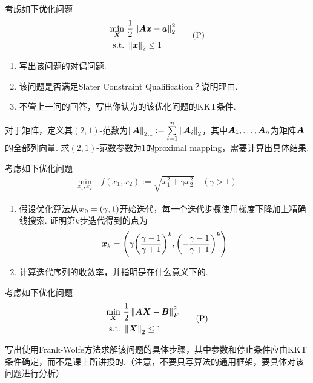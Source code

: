 \begin{question}[$10 = 6+2+2$]
    考虑如下优化问题
    \[
    \begin{aligned}
        \min_{\boldsymbol{X}} \ & \dfrac{1}{2} \left\lVert\boldsymbol{Ax} - \boldsymbol{a}\right\rVert_2^2 \\ 
        \text{s.t.} \ & \left\lVert\boldsymbol{x}\right\rVert_2 \leq 1
    \end{aligned}
    \tag{P}
    \]

    \begin{enumerate}
        \item 写出该问题的对偶问题. 
        \item 该问题是否满足Slater Constraint Qualification？说明理由. 
        \item 不管上一问的回答，写出你认为的该优化问题的KKT条件. 
    \end{enumerate}
\end{question}

\begin{question}[$10$]
    对于矩阵，定义其$(2,1)$-范数为$\left\lVert\boldsymbol{A}\right\rVert_{2,1} := \sum\limits_{i=1}^n \left\lVert\boldsymbol{A}_i\right\rVert_2$，其中$\boldsymbol{A}_1, \dots, \boldsymbol{A}_n$为矩阵$\boldsymbol{A}$的全部列向量. 求$(2,1)$-范数参数为$1$的proximal mapping，需要计算出具体结果. 
\end{question}

\begin{question}[$10$]
    考虑如下优化问题
    \[
    \begin{aligned}
        \min_{x_1, x_2} \ & f(x_1, x_2) := \sqrt{x_1^2 + \gamma x_2^2} \quad (\gamma > 1)
    \end{aligned}
    \tag{P}
    \]

    \begin{enumerate}
        \item 假设优化算法从$\boldsymbol{x}_0 = (\gamma, 1)$开始迭代，每一个迭代步骤使用梯度下降加上精确线搜索. 证明第$k$步迭代得到的点为
        \[
            \boldsymbol{x}_k = \left(\gamma {\left(\dfrac{\ensuremath{\gamma}- 1}{\ensuremath{\gamma}+ 1}\right)}^k, {\left(-\dfrac{\gamma - 1}{\gamma + 1}\right)}^k\right)
        \] 
        \item 计算迭代序列的收敛率，并指明是在什么意义下的. 
    \end{enumerate}
\end{question}

\begin{question}[$10$]
    考虑如下优化问题
    \[
    \begin{aligned}
        \min_{\boldsymbol{X}} \ & \dfrac{1}{2} \left\lVert\boldsymbol{AX} - \boldsymbol{B}\right\rVert_F^2 \\ 
        \text{s.t.} \ & \left\lVert\boldsymbol{X}\right\rVert_2 \leq 1
    \end{aligned}
    \tag{P}
    \]

    写出使用Frank-Wolfe方法求解该问题的具体步骤，其中参数和停止条件应由KKT条件确定，而不是课上所讲授的.（注意，不要只写算法的通用框架，要具体对该问题进行分析）
\end{question}


